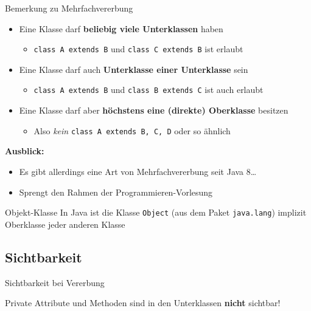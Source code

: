 \documentclass[18pt]{beamer}
\begin{document}
\begin{frame}{Bemerkung zu Mehrfachvererbung}
    \begin{itemize}
        \item Eine Klasse darf \textbf{beliebig viele Unterklassen} haben
        \begin{itemize}
            \item \texttt{class A extends B} und \texttt{class C extends B} ist erlaubt
        \end{itemize}
        \item Eine Klasse darf auch \textbf{Unterklasse einer Unterklasse} sein
        \begin{itemize}
            \item \texttt{class A extends B} und \texttt{class B extends C} ist auch erlaubt
        \end{itemize}
        \item Eine Klasse darf aber \textbf{höchstens eine (direkte) Oberklasse} besitzen
        \begin{itemize}
            \item Also \textit{kein} \texttt{class A extends B, C, D} oder so ähnlich
        \end{itemize}
    \end{itemize}
    \vspace{.4in}
    \pause
    \textbf{Ausblick:}
    \begin{itemize}
        \item Es gibt allerdings eine Art von Mehrfachvererbung seit Java 8\dots
        \item Sprengt den Rahmen der Programmieren-Vorlesung
    \end{itemize}
\end{frame}

\begin{frame}{Objekt-Klasse}
    In Java ist die Klasse \texttt{Object} (aus dem Paket \texttt{java.lang}) implizit Oberklasse jeder anderen Klasse
\end{frame}


\subsection{Sichtbarkeit}

\begin{frame}{Sichtbarkeit bei Vererbung}
    \begin{alertblock}{}
        Private Attribute und Methoden sind in den Unterklassen \textbf{nicht} sichtbar!
    \end{alertblock}

\end{frame}
\end{document}
